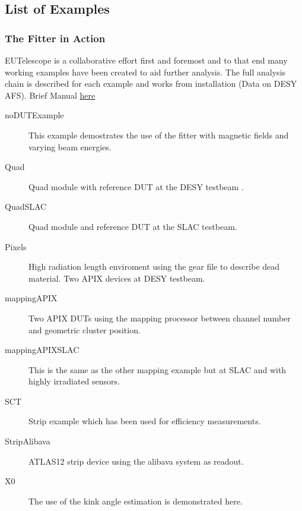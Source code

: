 \documentclass{beamer}
\begin{document}
%

%
\subsection{List of Examples}
\begin{frame}
\frametitle{The Fitter in Action}
EUTelescope is a collaborative effort first and foremost and to that end many working examples have been created to aid further analysis. The full analysis chain is described for each example and works from installation (Data on DESY AFS).  Brief Manual \href{https://github.com/AlexanderMorton/GBLManuel/blob/master/thesis.pdf}{here}
\begin{description} 
\item[noDUTExample] \small{This example demostrates the use of the fitter with magnetic fields and varying beam energies}.
\item[Quad] \small{Quad module with reference DUT at the DESY testbeam }.
\item[QuadSLAC]  \small{Quad module and reference DUT at the SLAC testbeam}.
\item[Pixels] \small{High radiation length enviroment using the gear file to describe dead material. Two APIX devices at DESY testbeam.}
\item[mappingAPIX] \small{Two APIX DUTs using the mapping processor between channel number and geometric cluster position.}
\item[mappingAPIXSLAC] \small{This is the same as the other mapping example but at SLAC and with highly irradiated sensors.}
\item[SCT] \small{Strip example which has been used for efficiency measurements.}
\item[StripAlibava] \small{ATLAS12 strip device using the alibava system as readout.}
\item[X0] \small{The use of the kink angle estimation is demonstrated here.}
\end{description} 
\end{frame}
\end{document}
